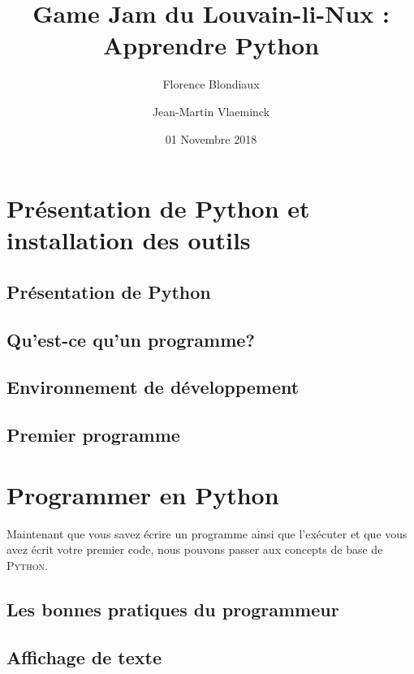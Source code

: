 \documentclass[12pt,a4paper,oneside]{report}
\title{Game Jam du Louvain-li-Nux : Apprendre Python}
\author{Florence Blondiaux\and Jean-Martin Vlaeminck}
\date{01 Novembre 2018}
\begin{document}
\maketitle
\tableofcontents

\chapter{Présentation de Python et installation des outils}

\section{Présentation de Python}


\section{Qu'est-ce qu'un programme?}


\section{Environnement de développement}


\section{Premier programme}









\chapter{Programmer en Python}
Maintenant que vous savez écrire un programme ainsi que l'exécuter et que vous avez écrit votre premier code, nous pouvons passer aux concepts de base de \textsc{Python}.

\section{Les bonnes pratiques du programmeur}


\section{Affichage de texte}

\end{document}
